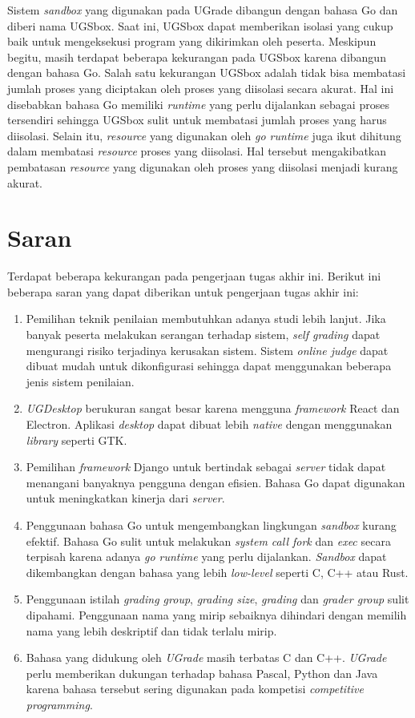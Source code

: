 \par Sistem \textit{sandbox} yang digunakan pada UGrade dibangun dengan bahasa Go dan diberi nama UGSbox. Saat ini, UGSbox dapat memberikan isolasi yang cukup baik untuk mengeksekusi program yang dikirimkan oleh peserta. Meskipun begitu, masih terdapat beberapa kekurangan pada UGSbox karena dibangun dengan bahasa Go. Salah satu kekurangan UGSbox adalah tidak bisa membatasi jumlah proses yang diciptakan oleh proses yang diisolasi secara akurat. Hal ini disebabkan bahasa Go memiliki \textit{runtime} yang perlu dijalankan sebagai proses tersendiri sehingga UGSbox sulit untuk membatasi jumlah proses yang harus diisolasi. Selain itu, \textit{resource} yang digunakan oleh \textit{go runtime} juga ikut dihitung dalam membatasi \textit{resource} proses yang diisolasi. Hal tersebut mengakibatkan pembatasan \textit{resource} yang digunakan oleh proses yang diisolasi menjadi kurang akurat.

\section{Saran}

\par Terdapat beberapa kekurangan pada pengerjaan tugas akhir ini. Berikut ini beberapa saran yang dapat diberikan untuk pengerjaan tugas akhir ini:
\begin{enumerate}
    \item Pemilihan teknik penilaian membutuhkan adanya studi lebih lanjut. Jika banyak peserta melakukan serangan terhadap sistem, \textit{self grading} dapat mengurangi risiko terjadinya kerusakan sistem. Sistem \textit{online judge} dapat dibuat mudah untuk dikonfigurasi sehingga dapat menggunakan beberapa jenis sistem penilaian.
    \item \textit{UGDesktop} berukuran sangat besar karena mengguna \textit{framework} React dan Electron. Aplikasi \textit{desktop} dapat dibuat lebih \textit{native} dengan menggunakan \textit{library} seperti GTK.
    \item Pemilihan \textit{framework} Django untuk bertindak sebagai \textit{server} tidak dapat menangani banyaknya pengguna dengan efisien. Bahasa Go dapat digunakan untuk meningkatkan kinerja dari \textit{server}.
    \item Penggunaan bahasa Go untuk mengembangkan lingkungan \textit{sandbox} kurang efektif. Bahasa Go sulit untuk melakukan \textit{system call fork} dan \textit{exec} secara terpisah karena adanya \textit{go runtime} yang perlu dijalankan. \textit{Sandbox} dapat dikembangkan dengan bahasa yang lebih \textit{low-level} seperti C, C++ atau Rust. 
    \item Penggunaan istilah \textit{grading group}, \textit{grading size}, \textit{grading} dan \textit{grader group} sulit dipahami. Penggunaan nama yang mirip sebaiknya dihindari dengan memilih nama yang lebih deskriptif dan tidak terlalu mirip. 
    \item Bahasa yang didukung oleh \textit{UGrade} masih terbatas C dan C++. \textit{UGrade} perlu memberikan dukungan terhadap bahasa Pascal, Python dan Java karena bahasa tersebut sering digunakan pada kompetisi \textit{competitive programming}.
\end{enumerate}
